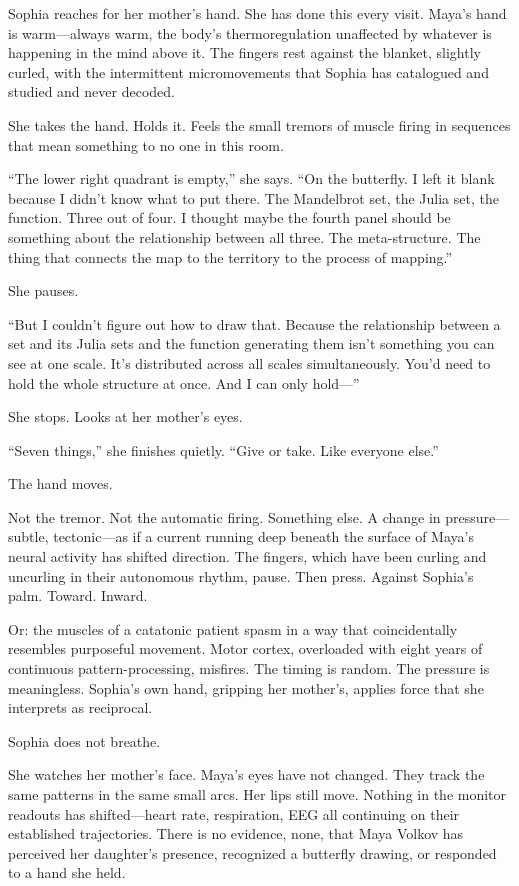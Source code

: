 Sophia reaches for her mother's hand. She has done this every visit. Maya's hand is warm---always warm, the body's thermoregulation unaffected by whatever is happening in the mind above it. The fingers rest against the blanket, slightly curled, with the intermittent micromovements that Sophia has catalogued and studied and never decoded.

She takes the hand. Holds it. Feels the small tremors of muscle firing in sequences that mean something to no one in this room.

``The lower right quadrant is empty,'' she says. ``On the butterfly. I left it blank because I didn't know what to put there. The Mandelbrot set, the Julia set, the function. Three out of four. I thought maybe the fourth panel should be something about the relationship between all three. The meta-structure. The thing that connects the map to the territory to the process of mapping.''

She pauses.

``But I couldn't figure out how to draw that. Because the relationship between a set and its Julia sets and the function generating them isn't something you can see at one scale. It's distributed across all scales simultaneously. You'd need to hold the whole structure at once. And I can only hold---''

She stops. Looks at her mother's eyes.

``Seven things,'' she finishes quietly. ``Give or take. Like everyone else.''

The hand moves.

Not the tremor. Not the automatic firing. Something else. A change in pressure---subtle, tectonic---as if a current running deep beneath the surface of Maya's neural activity has shifted direction. The fingers, which have been curling and uncurling in their autonomous rhythm, pause. Then press. Against Sophia's palm. Toward. Inward.

Or: the muscles of a catatonic patient spasm in a way that coincidentally resembles purposeful movement. Motor cortex, overloaded with eight years of continuous pattern-processing, misfires. The timing is random. The pressure is meaningless. Sophia's own hand, gripping her mother's, applies force that she interprets as reciprocal.

Sophia does not breathe.

She watches her mother's face. Maya's eyes have not changed. They track the same patterns in the same small arcs. Her lips still move. Nothing in the monitor readouts has shifted---heart rate, respiration, EEG all continuing on their established trajectories. There is no evidence, none, that Maya Volkov has perceived her daughter's presence, recognized a butterfly drawing, or responded to a hand she held.

